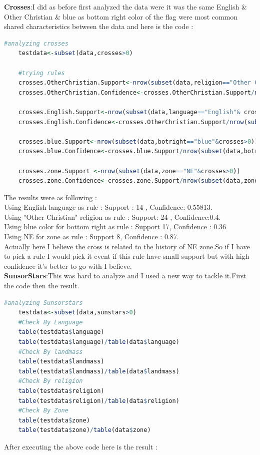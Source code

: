 \documentclass{article}
\begin{document}
	\textbf{Crosses}:I did as before first analyzed the data were it was the same English \& Other Christian \& blue as bottom right color of the flag were most common shared characteristics between the data and here is the code :
	\begin{lstlisting}[language=R]
	#analyzing crosses
	testdata<-subset(data,crosses>0)
	
	#trying rules
	crosses.OtherChristian.Support<-nrow(subset(data,religion=="Other Christian"& crosses>0))
	crosses.OtherChristian.Confidence<-crosses.OtherChristian.Support/nrow(subset(data,religion=="Other Christian"))
	
	crosses.English.Support<-nrow(subset(data,language=="English"& crosses>0))
	crosses.English.Confidence<-crosses.OtherChristian.Support/nrow(subset(data,language=="English"))
	
	crosses.blue.Support<-nrow(subset(data,botright=="blue"&crosses>0))
	crosses.blue.Confidence<-crosses.blue.Support/nrow(subset(data,botright=="blue"))
	
	crosses.zone.Support <-nrow(subset(data,zone=="NE"&crosses>0))
	crosses.zone.Confidence<-crosses.zone.Support/nrow(subset(data,zone=="NE"))
	\end{lstlisting}
	The results were as following : \\
	Using English language as rule : Support : 14 , Confidence: 0.55813.\\
	Using "Other Christian" religion as rule : Support: 24 , Confidence:0.4.\\
	Using blue color for bottom right as rule : Support 17, Confidence : 0.36\\
	Using NE for zone as rule : Support 8, Confidence : 0.87.\\
	Actually here I believe the cross is related to the history of NE zone.So if I have to pick a rule I would pick it event if this rule have small support but with high confidence it's better to go with I believe.\\
	
	\textbf{SunsorStars}:This was hard to analyze and I used a new way to tackle it.First the code then the result.
	\begin{lstlisting}[language=R]
	#analyzing Sunsorstars
	testdata<-subset(data,sunstars>0)
	#Check By Language
	table(testdata$language)
	table(testdata$language)/table(data$language)
	#Check By landmass
	table(testdata$landmass)
	table(testdata$landmass)/table(data$landmass)
	#Check By religion
	table(testdata$religion)
	table(testdata$religion)/table(data$religion)
	#Check By Zone
	table(testdata$zone)
	table(testdata$zone)/table(data$zone)
	\end{lstlisting}
	After executing the above code here is the result :\\
	
\end{document}
